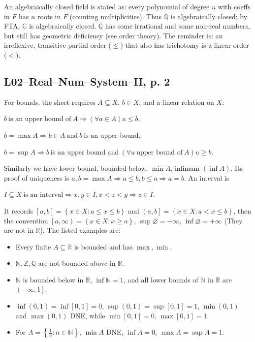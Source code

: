 An algebraically closed field is stated as: every polynomial of degree \(n\) with coeffs in \(F\) has \(n\) roots in \(F\) (counting multiplicities). Thus \(\bar{\mathbb{Q}}\) is algebraically closed; by FTA, \(\mathbb{C}\) is algebraically closed. \(\bar{\mathbb{Q}}\) has some irrational and some non-real numbers, but still has geometric deficiency (see order theory). The reminder is: an irreflexive, transitive partial order (\(\leq\)) that also has trichotomy is a linear order (\(<\)).

\subsection{L02--Real--Num--System--II, p. 2}

For bounds, the sheet requires \(A \subseteq X\), \(b \in X\), and a linear relation on \(X\):

\(b\ \text{is an upper bound of}\ A\Rightarrow\left( {\forall a \in A} \right)a \leq b,\)

\(b = \max A\Rightarrow b \in A\ \text{and}\ b\ \text{is an upper bound},\)

\(b = \sup A\Rightarrow b\ \text{is an upper bound and}\ \left( {\forall u\ \text{upper bound of}\ A} \right)u \geq b.\)

Similarly we have lower bound, bounded below, \(\min A\), infimum \(\left( {\inf A} \right)\). Its proof of uniqueness is \(a,b = \max A\Rightarrow a \leq b,b \leq a\Rightarrow a = b\). An interval is

\(I \subseteq X\ \text{is an interval}\Rightarrow x,y \in I,x < z < y\Rightarrow z \in I.\)

It records \(\left\lbrack {a,b} \right\rbrack = \left\{ {x \in X:a \leq x \leq b} \right\}\) and \(\left( {a,b} \right\rbrack = \left\{ {x \in X:a < x \leq b} \right\}\), then the convention \(\left\lbrack {a,\infty} \right) = \left\{ {x \in X:x \geq a} \right\}\), \(\sup\varnothing = - \infty\), \(\inf\varnothing = + \infty\) (They are not in \(\mathbb{R}\)). The listed examples are:

\begin{itemize}
\tightlist
\item
  Every finite \(A \subseteq \mathbb{R}\) is bounded and has \(\max,\min\).
\item
  \(\mathbb{N},\mathbb{Z},\mathbb{Q}\) are not bounded above in \(\mathbb{R}\).
\item
  \(\mathbb{N}\) is bounded below in \(\mathbb{R}\), \(\inf\mathbb{N} = 1\), and all lower bounds of \(\mathbb{N}\) in \(\mathbb{R}\) are \(\left( {- \infty,1} \right\rbrack\).
\item
  \(\inf\left( {0,1} \right) = \inf\left\lbrack {0,1} \right\rbrack = 0\), \(\sup\left( {0,1} \right) = \sup\left\lbrack {0,1} \right\rbrack = 1\), \(\min\left( {0,1} \right)\) and \(\max\left( {0,1} \right)\) DNE, while \(\min\left\lbrack {0,1} \right\rbrack = 0\), \(\max\left\lbrack {0,1} \right\rbrack = 1\).
\item
  For \(A = \left\{ {\frac{1}{n}:n \in \mathbb{N}} \right\}\), \(\min A\) DNE, \(\inf A = 0\), \(\max A = \sup A = 1\).
\end{itemize}

